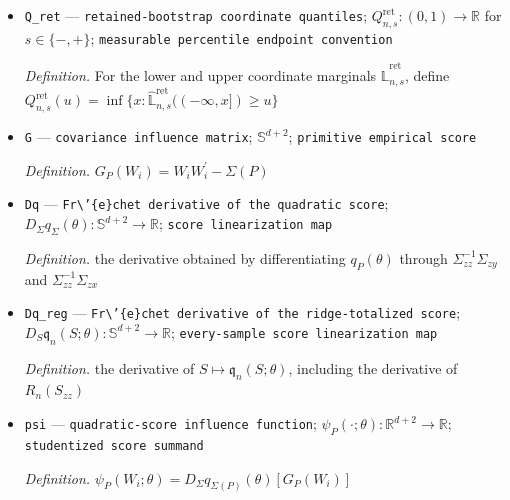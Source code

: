 \documentclass{article}
\begin{document}
\begin{itemize}
  \par\smallskip\noindent\emph{Definition.} Let \(E_{n,b}^{*}=(\inf\widehat\Theta_{n,b}^{*,\mathrm{tot}},\sup\widehat\Theta_{n,b}^{*,\mathrm{tot}})\) and \(E_n=(\inf\widehat\Theta_n^{\mathrm{tot}},\sup\widehat\Theta_n^{\mathrm{tot}})\). Set \(\widehat{\mathbb L}_n^{\mathrm{ret}}=M_n^{-1}\sum_{b=1}^{B_n}J_{n,b}\operatorname{Dirac}_{E_{n,b}^{*}}\) if \(M_n>0\), and set \(\widehat{\mathbb L}_n^{\mathrm{ret}}=\operatorname{Dirac}_{E_n}\) if \(M_n=0\)
  \item \texttt{Q\_\allowbreak{}ret} --- \texttt{retained-\allowbreak{}bootstrap coordinate quantiles}; \(Q_{n,s}^{\mathrm{ret}}:(0,1)\to\mathbb R\) for \(s\in\{-,+\}\); \texttt{measurable percentile endpoint convention}
  \par\smallskip\noindent\emph{Definition.} For the lower and upper coordinate marginals \(\widehat{\mathbb L}_{n,s}^{\mathrm{ret}}\), define \(Q_{n,s}^{\mathrm{ret}}(u)=\inf\{x:\widehat{\mathbb L}_{n,s}^{\mathrm{ret}}(( -\infty,x])\geq u\}\)
  \item \texttt{G} --- \texttt{covariance influence matrix}; \(\mathbb S^{d+2}\); \texttt{primitive empirical score}
  \par\smallskip\noindent\emph{Definition.} \(G_P(W_i)=W_iW_i^{\prime}-\Sigma(P)\)
  \item \texttt{Dq} --- \texttt{Fr\textbackslash{}\allowbreak{}'\{e\}\allowbreak{}chet derivative of the quadratic score}; \(D_{\Sigma}q_{\Sigma}(\theta):\mathbb S^{d+2}\to\mathbb R\); \texttt{score linearization map}
  \par\smallskip\noindent\emph{Definition.} the derivative obtained by differentiating \(q_P(\theta)\) through \(\Sigma_{zz}^{-1}\Sigma_{zy}\) and \(\Sigma_{zz}^{-1}\Sigma_{zx}\)
  \item \texttt{Dq\_\allowbreak{}reg} --- \texttt{Fr\textbackslash{}\allowbreak{}'\{e\}\allowbreak{}chet derivative of the ridge-\allowbreak{}totalized score}; \(D_S\mathfrak q_n(S;\theta):\mathbb S^{d+2}\to\mathbb R\); \texttt{every-\allowbreak{}sample score linearization map}
  \par\smallskip\noindent\emph{Definition.} the derivative of \(S\mapsto\mathfrak q_n(S;\theta)\), including the derivative of \(R_n(S_{zz})\)
  \item \texttt{psi} --- \texttt{quadratic-\allowbreak{}score influence function}; \(\psi_P(\cdot;\theta):\mathbb R^{d+2}\to\mathbb R\); \texttt{studentized score summand}
  \par\smallskip\noindent\emph{Definition.} \(\psi_P(W_i;\theta)=D_{\Sigma}q_{\Sigma(P)}(\theta)[G_P(W_i)]\)

\end{itemize}
\end{document}
